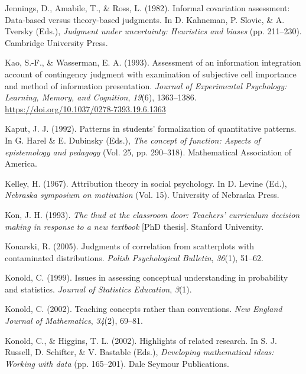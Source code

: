 \documentclass[11pt]{umnthesis}
\newlength{\cslhangindent}
\newenvironment{CSLReferences}[2] %
 {%
  \setlength{\parindent}{0pt}
  \ifodd #1 \everypar{\setlength{\hangindent}{\cslhangindent}}\ignorespaces\fi
  \ifnum #2 > 0
  \setlength{\parskip}{#2\baselineskip}
  \fi
 }%
 {}
\begin{document}
\begin{CSLReferences}{1}{0}
\leavevmode{}%
Jennings, D., Amabile, T., \& Ross, L. (1982). Informal covariation assessment: Data-based versus theory-based judgments. In D. Kahneman, P. Slovic, \& A. Tversky (Eds.), \emph{Judgment under uncertainty: Heuristics and biases} (pp. 211--230). Cambridge University Press.

\leavevmode{}%
Kao, S.-F., \& Wasserman, E. A. (1993). Assessment of an information integration account of contingency judgment with examination of subjective cell importance and method of information presentation. \emph{Journal of Experimental Psychology: Learning, Memory, and Cognition}, \emph{19}(6), 1363--1386. \url{https://doi.org/10.1037/0278-7393.19.6.1363}

\leavevmode{}%
Kaput, J. J. (1992). Patterns in students' formalization of quantitative patterns. In G. Harel \& E. Dubinsky (Eds.), \emph{The concept of function: Aspects of epistemology and pedagogy} (Vol. 25, pp. 290--318). Mathematical Association of America.

\leavevmode{}%
Kelley, H. (1967). Attribution theory in social psychology. In D. Levine (Ed.), \emph{Nebraska symposium on motivation} (Vol. 15). University of Nebraska Press.

\leavevmode{}%
Kon, J. H. (1993). \emph{The thud at the classroom door: Teachers' curriculum decision making in response to a new textbook} {[}PhD thesis{]}. Stanford University.

\leavevmode{}%
Konarski, R. (2005). Judgments of correlation from scatterplots with contaminated distributions. \emph{Polish Psychological Bulletin}, \emph{36}(1), 51--62.

\leavevmode{}%
Konold, C. (1999). Issues in assessing conceptual understanding in probability and statistics. \emph{Journal of Statistics Education}, \emph{3}(1).

\leavevmode{}%
Konold, C. (2002). Teaching concepts rather than conventions. \emph{New England Journal of Mathematics}, \emph{34}(2), 69--81.

\leavevmode{}%
Konold, C., \& Higgins, T. L. (2002). Highlights of related research. In S. J. Russell, D. Schifter, \& V. Bastable (Eds.), \emph{Developing mathematical ideas: Working with data} (pp. 165--201). Dale Seymour Publications.


\end{CSLReferences}
\end{document}
